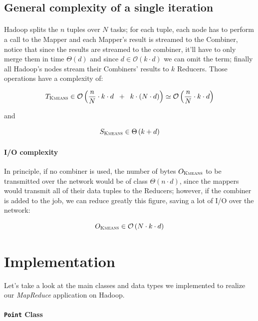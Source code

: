 \documentclass[parskip=full]{report}
\begin{document}
\subsection{General complexity of a single iteration}

\paragraph{}
Hadoop splits the $n$ tuples over $N$ tasks; for each tuple, each node has to 
perform a call to the Mapper and each Mapper's result is streamed to the 
Combiner, notice that since the results are streamed to the combiner, it'll 
have to only merge them in time $\Theta(d)$ and since $d \in \mathcal{O}(k\cdot 
d)$ we can omit the term; finally all Hadoop's nodes stream 
their Combiners' results to $k$ Reducers. Those operations have a complexity of:

\begin{equation}
T_\textsc{Kmeans} \in \mathcal{O} \left(
	\dfrac{n}{N}\cdot k \cdot d \; \;+\; \;
	k \cdot \left(N \cdot d\right)
\right)
\simeq
\mathcal{O} \left(
	\dfrac{n}{N}\cdot k \cdot d
\right)
\end{equation}

and 

\[
S_\textsc{Kmeans} \in \Theta \left(k + d\right)
\]

\paragraph{I/O complexity}
In principle, if no combiner is used, the number of bytes $O_\textsc{Kmeans}$ 
to be 
transmitted over the network would be of class $\Theta(n \cdot d)$, since the 
mappers would transmit all of their data tuples to the Reducers; however, if 
the combiner is added to the job, we can reduce greatly this figure, saving a 
lot of I/O over the network:

\[
O_\textsc{Kmeans} \in \mathcal{O} \left(N \cdot k \cdot d\right)
\]

\section{Implementation}

Let's take a look at the main classes and data types we implemented to realize 
our \emph{MapReduce} application on Hadoop.

\paragraph{\texttt{Point} Class}
\end{document}
